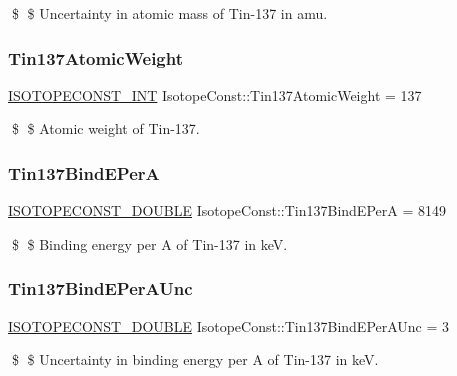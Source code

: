 \$ \$ Uncertainty in atomic mass of Tin-\/137 in amu. \mbox{\label{group___isotope_const-_tin-_sn137_gae0ea868e02045f4a567ae81c5ec6f932}} 
\subsubsection{\texorpdfstring{Tin137\+Atomic\+Weight}{Tin137AtomicWeight}}
{\footnotesize\ttfamily \mbox{\hyperlink{group___isotope_const-_macros_ga5f18360b3e99483a35c32d789e62621c}{I\+S\+O\+T\+O\+P\+E\+C\+O\+N\+S\+T\+\_\+\+I\+NT}} Isotope\+Const\+::\+Tin137\+Atomic\+Weight = 137}

\$ \$ Atomic weight of Tin-\/137. \mbox{\label{group___isotope_const-_tin-_sn137_ga6517e85cb7f1a1bbeaee417bd479e09b}} 
\subsubsection{\texorpdfstring{Tin137\+Bind\+E\+PerA}{Tin137BindEPerA}}
{\footnotesize\ttfamily \mbox{\hyperlink{group___isotope_const-_macros_ga8f45a7272ce02c0b4c65c44636ed719a}{I\+S\+O\+T\+O\+P\+E\+C\+O\+N\+S\+T\+\_\+\+D\+O\+U\+B\+LE}} Isotope\+Const\+::\+Tin137\+Bind\+E\+PerA = 8149}

\$ \$ Binding energy per A of Tin-\/137 in keV. \mbox{\label{group___isotope_const-_tin-_sn137_ga274f348397badafc8d52ca94746443c1}} 
\subsubsection{\texorpdfstring{Tin137\+Bind\+E\+Per\+A\+Unc}{Tin137BindEPerAUnc}}
{\footnotesize\ttfamily \mbox{\hyperlink{group___isotope_const-_macros_ga8f45a7272ce02c0b4c65c44636ed719a}{I\+S\+O\+T\+O\+P\+E\+C\+O\+N\+S\+T\+\_\+\+D\+O\+U\+B\+LE}} Isotope\+Const\+::\+Tin137\+Bind\+E\+Per\+A\+Unc = 3}

\$ \$ Uncertainty in binding energy per A of Tin-\/137 in keV. \mbox{\label{group___isotope_const-_tin-_sn137_gac974d985eed04d6febe69e7f1fde0e1f}} 
